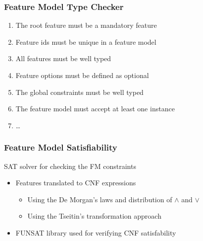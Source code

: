 \documentclass{beamer}
\begin{document}
\begin{frame}
\frametitle{Feature Model Type Checker}

\begin{enumerate}
 \item The root feature must be a mandatory feature
 \item Feature ids must be unique in a feature model
 \item All features must be well typed
 \item Feature options must be defined as optional
 \item The global constraints must be well typed
 \item The feature model must accept at least one instance
 \item \ldots
\end{enumerate}
\end{frame}

\begin{frame}
\frametitle{Feature Model Satisfiability}
\begin{block}{SAT solver for checking the FM constraints}
 \begin{itemize}
  \item Features translated to CNF expressions 
  \begin{itemize}
   \item Using the De Morgan's laws and distribution of $\land$ and $\lor$
   \item Using the Tseitin's transformation approach 
  \end{itemize}
  \item FUNSAT library used for verifying CNF satisfability
 \end{itemize} 
\end{block}
\end{frame}
\end{document}

